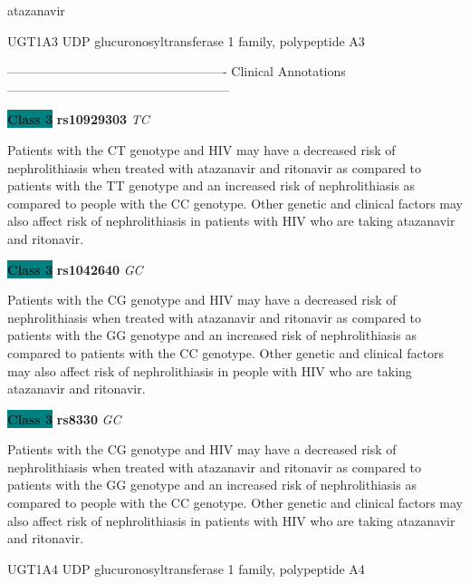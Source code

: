 \documentclass{resume} %
\begin{document}
\begin{rSection}{ atazanavir }
\begin{rSubsection}{ UGT1A3 }{ UDP glucuronosyltransferase 1 family, polypeptide A3 }{}{}
\item[] ---------------------------------------------------- Clinical Annotations -----------------------------------------------------\newline
\item \textbf{\colorbox{teal} {Class 3}} \textbf{ rs10929303 } \textit{ TC }
\item[] Patients with the CT genotype and HIV may have a decreased risk of nephrolithiasis when treated with atazanavir and ritonavir as compared to patients with the TT genotype and an increased risk of nephrolithiasis as compared to people with the CC genotype. Other genetic and clinical factors may also affect risk of nephrolithiasis in patients with HIV who are taking atazanavir and ritonavir. \item \textbf{\colorbox{teal} {Class 3}} \textbf{ rs1042640 } \textit{ GC }
\item[] Patients with the CG genotype and HIV may have a decreased risk of nephrolithiasis when treated with atazanavir and ritonavir as compared to patients with the GG genotype and an increased risk of nephrolithiasis as compared to patients with the CC genotype. Other genetic and clinical factors may also affect risk of nephrolithiasis in people with HIV who are taking atazanavir and ritonavir.\item \textbf{\colorbox{teal} {Class 3}} \textbf{ rs8330 } \textit{ GC }
\item[] Patients with the CG genotype and HIV may have a decreased risk of nephrolithiasis when treated with atazanavir and ritonavir as compared to patients with the GG genotype and an increased risk of nephrolithiasis as compared to people with the CC genotype. Other genetic and clinical factors may also affect risk of nephrolithiasis in patients with HIV who are taking atazanavir and ritonavir.
\end{rSubsection}\begin{rSubsection}{ UGT1A4 }{ UDP glucuronosyltransferase 1 family, polypeptide A4 }{}{}
\item[]


\end{rSubsection}
\end{rSection}
\end{document}
